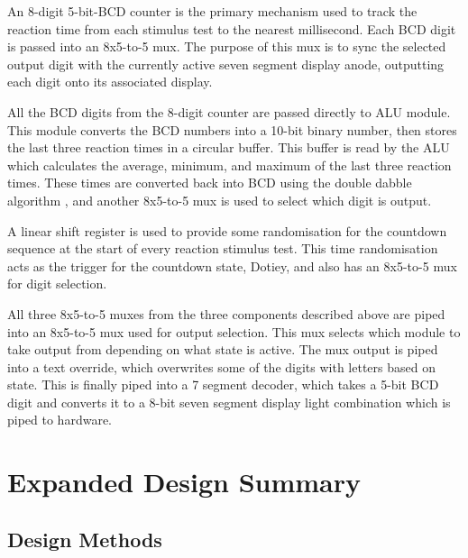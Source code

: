 \documentclass[11pt]{article}
\begin{document}
An 8-digit 5-bit-BCD counter is the primary mechanism used to track the reaction time from each stimulus test to the nearest millisecond. Each BCD digit is passed into an 8x5-to-5 mux. The purpose of this mux is to sync the selected output digit with the currently active seven segment display anode, outputting each digit onto its associated display.



All the BCD digits from the 8-digit counter are passed directly to ALU module. This module converts the BCD numbers into a 10-bit binary number, then stores the last three reaction times in a circular buffer. This buffer is read by the ALU which calculates the average, minimum, and maximum of the last three reaction times. These times are converted back into BCD using the double dabble algorithm \cite{double_dabble}, and another 8x5-to-5 mux is used to select which digit is output.

A linear shift register is used to provide some randomisation for the countdown sequence at the start of every reaction stimulus test. This time randomisation acts as the trigger for the countdown state, Dotiey, and also has an 8x5-to-5 mux for digit selection.

All three 8x5-to-5 muxes from the three components described above are piped into an 8x5-to-5 mux used for output selection. This mux selects which module to take output from depending on what state is active. The mux output is piped into a text override, which overwrites some of the digits with letters based on state. This is finally piped into a 7 segment decoder, which takes a 5-bit BCD digit and converts it to a 8-bit seven segment display light combination which is piped to hardware.

\section{Expanded Design Summary}

\subsection{Design Methods}
\end{document}
